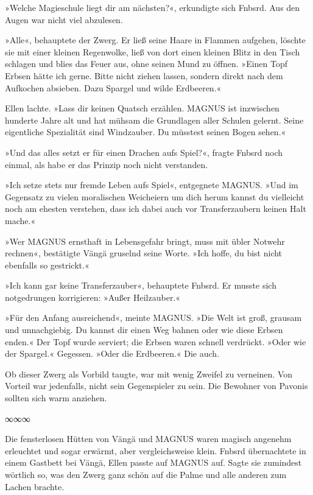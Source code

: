 »Welche Magieschule liegt dir am nächsten?«, erkundigte sich Fnbsrd. Aus den Augen war nicht viel abzulesen.

»Alle«, behauptete der Zwerg. Er ließ seine Haare in Flammen aufgehen, löschte sie mit einer kleinen Regenwolke, ließ von dort einen kleinen Blitz in den Tisch schlagen und blies das Feuer aus, ohne seinen Mund zu öffnen. »Einen Topf Erbsen hätte ich gerne. Bitte nicht ziehen lassen, sondern direkt nach dem Aufkochen absieben. Dazu Spargel und wilde Erdbeeren.«

Ellen lachte. »Lass dir keinen Quatsch erzählen. MAGNUS ist inzwischen hunderte Jahre alt und hat mühsam die Grundlagen aller Schulen gelernt. Seine eigentliche Spezialität sind Windzauber. Du müsstest seinen Bogen sehen.«

»Und das alles setzt er für einen Drachen aufs Spiel?«, fragte Fnbsrd noch einmal, als habe er das Prinzip noch nicht verstanden.

»Ich setze stets nur fremde Leben aufs Spiel«, entgegnete MAGNUS. »Und im Gegensatz zu vielen moralischen Weicheiern um dich herum kannst du vielleicht noch am ehesten verstehen, dass ich dabei auch vor Transferzaubern keinen Halt mache.«

»Wer MAGNUS ernsthaft in Lebensgefahr bringt, muss mit übler Notwehr rechnen«, bestätigte Vängä gruselnd seine Worte. »Ich hoffe, du bist nicht ebenfalls so gestrickt.«

»Ich kann gar keine Transferzauber«, behauptete Fnbsrd. Er musste sich notgedrungen korrigieren: »Außer Heilzauber.«

»Für den Anfang ausreichend«, meinte MAGNUS. »Die Welt ist groß, grausam und unnachgiebig. Du kannst dir einen Weg bahnen oder wie diese Erbsen enden.« Der Topf wurde serviert; die Erbsen waren schnell verdrückt. »Oder wie der Spargel.« Gegessen. »Oder die Erdbeeren.« Die auch.

Ob dieser Zwerg als Vorbild taugte, war mit wenig Zweifel zu verneinen. Von Vorteil war jedenfalls, nicht sein Gegenspieler zu sein. Die Bewohner von Pavonis sollten sich warm anziehen.

\begin{center}
∞∞∞
\end{center}

Die fensterlosen Hütten von Vängä und MAGNUS waren magisch angenehm erleuchtet und sogar erwärmt, aber vergleichsweise klein. Fnbsrd übernachtete in einem Gastbett bei Vängä, Ellen passte auf MAGNUS auf. Sagte sie zumindest wörtlich so, was den Zwerg ganz schön auf die Palme und alle anderen zum Lachen brachte.

